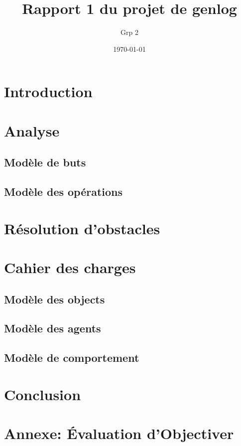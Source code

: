 \documentclass[12pt,openany]{book}
\title{Rapport 1 du projet de genlog}
\author{Grp 2}
\date{\today}
\begin{document}
\setlength{\parskip}{1em}

\maketitle
\tableofcontents

\chapter*{Introduction}
	
\chapter{Analyse}
	
		
	\section{Modèle de buts}
		

	\section{Modèle des opérations}
		

\chapter{Résolution d'obstacles}
	

\chapter{Cahier des charges}
	\section{Modèle des objects}
		

	\section{Modèle des agents}
		
	\section{Modèle de comportement}
		

\chapter*{Conclusion}
	

\chapter{Annexe: Évaluation d'Objectiver}
	
\end{document}

